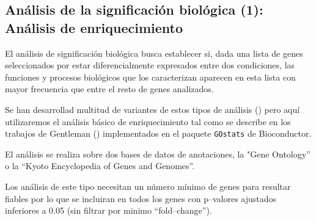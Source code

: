 \documentclass[a4paper]{article}\usepackage[]{graphicx}\usepackage[]{color}
\begin{document}
\subsection{Análisis de la significación biológica (1): Análisis de enriquecimiento}

El análisis de significación biológica busca establecer si, dada una lista de genes seleccionados por estar diferencialmente expresados entre dos condiciones, las funciones y procesos biológicos que los caracterizan aparecen en esta lista con mayor frecuencia que entre el resto de genes analizados.

Se han desarrollad multitud de variantes de estos tipos de análisis (\cite{Khatri:2005}) pero aquí utilizaremos el análisis básico de enriquecimiento tal como se describe en los trabajos de Gentleman (\cite{Gentleman:2004}) implementados en el paquete \texttt{GOstats} de Bioconductor.

El análisis se realiza sobre dos bases de datos de anotaciones, la "Gene Ontology'' o la ``Kyoto Encyclopedia of Genes and Genomes''.

Los análisis de este tipo necesitan un número mínimo de genes para resultar fiables por lo que se incluiran en todos los genes con p--valores ajustados inferiores a 0.05 (sin filtrar por minimo ``fold--change'').
\end{document}
